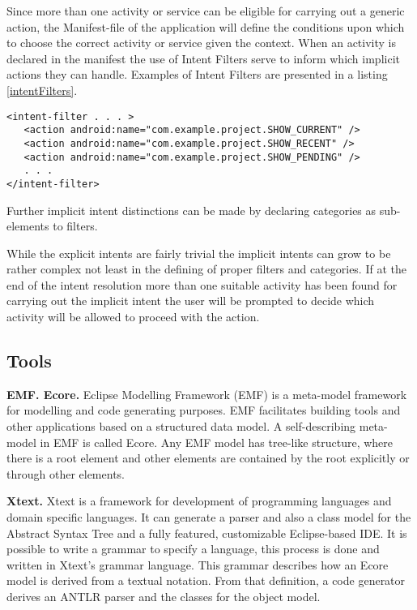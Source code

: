 Since more than one activity or service can be eligible for carrying out a generic action, the Manifest-file of the application will define the conditions upon which to choose the correct activity or service given the context. When an activity is declared in the manifest the use of Intent Filters serve to inform which implicit actions they can handle. Examples of Intent Filters are presented in a listing \ref{intentFilters}.

{\footnotesize\begin{lstlisting}[label=intentFilters,caption=Intent Filters]
<intent-filter . . . >
   <action android:name="com.example.project.SHOW_CURRENT" />
   <action android:name="com.example.project.SHOW_RECENT" />
   <action android:name="com.example.project.SHOW_PENDING" />
   . . .
</intent-filter>
\end{lstlisting}}

Further implicit intent distinctions can be made by declaring categories as sub-elements to filters.

While the explicit intents are fairly trivial the implicit intents can grow to be rather complex not least in the defining of proper filters and categories. If at the end of the intent resolution more than one suitable activity has been found for carrying out the implicit intent the user will be prompted to decide which activity will be allowed to proceed with the action. 


\subsection{Tools}
\label{tools}
\textbf{EMF. Ecore.} Eclipse Modelling Framework (EMF) \cite{emf} is a meta-model framework for modelling and code generating purposes. EMF facilitates building tools and other applications based on a structured data model. A self-describing meta-model in EMF is called Ecore. Any EMF model has tree-like structure, where there is a root element and other elements are contained by the root explicitly or through other elements. 

\textbf{Xtext.} Xtext \cite{xtext} is a framework for development of programming languages and domain specific languages. It can generate a parser and also a class model for the Abstract Syntax Tree and a fully featured, customizable Eclipse-based IDE. It is possible to write a grammar to specify a language, this process is done and written in Xtext's grammar language. This grammar describes how an Ecore model is derived from a textual notation. From that definition, a code generator derives an ANTLR parser and the classes for the object model.

